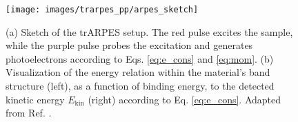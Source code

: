 \begin{figure}
	\centering
	\texttt{[image: images/trarpes\_pp/arpes\_sketch]}
	\caption{(a) Sketch of the trARPES setup. The red pulse excites the sample, while the purple pulse probes the excitation and generates photoelectrons according to Eqs. \ref{eq:e_cons} and \ref{eq:mom}. (b) Visualization of the energy relation within the material’s band structure (left), as a function of binding energy, to the detected kinetic energy $E_\text{kin}$ (right) according to Eq. \ref{eq:e_cons}. Adapted from Ref. \cite{hufner_photoelectron_1995}.}
	\label{fig:arpes_sketch}
\end{figure}

